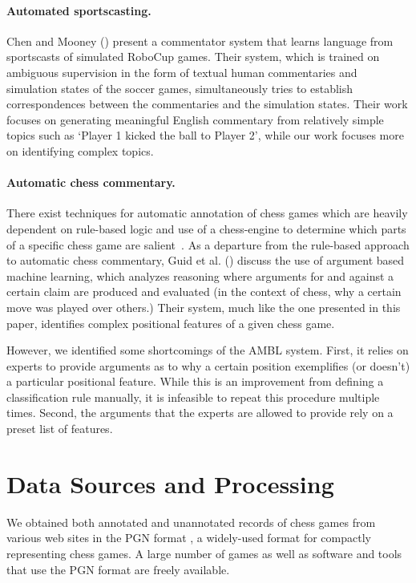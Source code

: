 \documentclass[11pt]{article}
\begin{document}
\paragraph{Automated sportscasting.} Chen and Mooney (\cite{learning-to-sportscast}) present a commentator system that learns language from sportscasts of simulated RoboCup games. Their system, which is trained on ambiguous supervision in the form of textual human commentaries and simulation states of the soccer games, simultaneously tries to establish correspondences between the commentaries and the simulation states. Their work focuses on generating meaningful English commentary from relatively simple topics such as ‘Player 1 kicked the ball to Player 2’, while our work focuses more on identifying complex topics.

\paragraph{Automatic chess commentary.} There exist techniques for automatic annotation of chess games which are heavily dependent on rule-based logic and use of a chess-engine to determine which parts of a specific chess game are salient~\cite{cambridge-chess-annotation}. As a departure from the rule-based approach to automatic chess commentary, Guid et al. (\cite{learning-positional-features}) discuss the use of argument based machine learning, which analyzes reasoning where arguments for and against a certain claim are produced and evaluated (in the context of chess, why a certain move was played over others.) Their system, much like the one presented in this paper, identifies complex positional features of a given chess game.

However, we identified some shortcomings of the AMBL system. First, it relies on experts to provide arguments as to why a certain position exemplifies (or doesn’t) a particular positional feature. While this is an improvement from defining a classification rule manually, it is infeasible to repeat this procedure multiple times. Second, the arguments that the experts are allowed to provide rely on a preset list of features.

\section{Data Sources and Processing}
We obtained both annotated and unannotated records of chess games from various web sites in the PGN format \cite{pgn}, a widely-used format for compactly representing chess games. A large number of games as well as software and tools that use the PGN format are freely available. 
\end{document}
